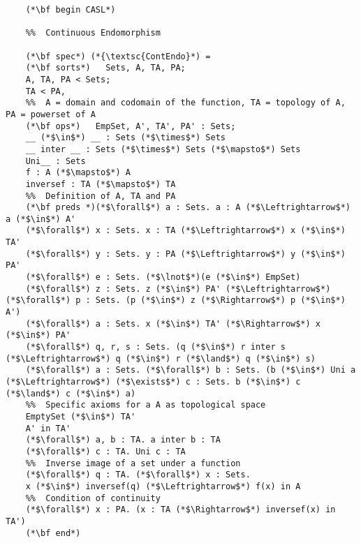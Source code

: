 \documentclass{standalone}
\begin{document}
\begin{lstlisting}
	(*\bf begin CASL*)

	%%  Continuous Endomorphism

	(*\bf spec*) (*{\textsc{ContEndo}*) =	    
	(*\bf sorts*)	Sets, A, TA, PA;
	A, TA, PA < Sets;
	TA < PA,
	%%  A = domain and codomain of the function, TA = topology of A, PA = powerset of A
	(*\bf ops*)   EmpSet, A', TA', PA' : Sets;
	__ (*$\in$*) __ : Sets (*$\times$*) Sets
	__ inter __ : Sets (*$\times$*) Sets (*$\mapsto$*) Sets
	Uni__ : Sets
	f : A (*$\mapsto$*) A
	inversef : TA (*$\mapsto$*) TA 
	%%  Definition of A, TA and PA
	(*\bf preds *)(*$\forall$*) a : Sets. a : A (*$\Leftrightarrow$*) a (*$\in$*) A'
	(*$\forall$*) x : Sets. x : TA (*$\Leftrightarrow$*) x (*$\in$*) TA'
	(*$\forall$*) y : Sets. y : PA (*$\Leftrightarrow$*) y (*$\in$*) PA'  
	(*$\forall$*) e : Sets. (*$\lnot$*)(e (*$\in$*) EmpSet)
	(*$\forall$*) z : Sets. z (*$\in$*) PA' (*$\Leftrightarrow$*) (*$\forall$*) p : Sets. (p (*$\in$*) z (*$\Rightarrow$*) p (*$\in$*) A')
	(*$\forall$*) a : Sets. x (*$\in$*) TA' (*$\Rightarrow$*) x (*$\in$*) PA'  
	(*$\forall$*) q, r, s : Sets. (q (*$\in$*) r inter s (*$\Leftrightarrow$*) q (*$\in$*) r (*$\land$*) q (*$\in$*) s)
	(*$\forall$*) a : Sets. (*$\forall$*) b : Sets. (b (*$\in$*) Uni a (*$\Leftrightarrow$*) (*$\exists$*) c : Sets. b (*$\in$*) c (*$\land$*) c (*$\in$*) a)
	%%  Specific axioms for a A as topological space
	EmptySet (*$\in$*) TA'
	A' in TA'
	(*$\forall$*) a, b : TA. a inter b : TA 
	(*$\forall$*) c : TA. Uni c : TA
	%%  Inverse image of a set under a function
	(*$\forall$*) q : TA. (*$\forall$*) x : Sets. 
	x (*$\in$*) inversef(q) (*$\Leftrightarrow$*) f(x) in A
	%%  Condition of continuity
	(*$\forall$*) x : PA. (x : TA (*$\Rightarrow$*) inversef(x) in TA')
	(*\bf end*)
\end{lstlisting}
\end{document}

